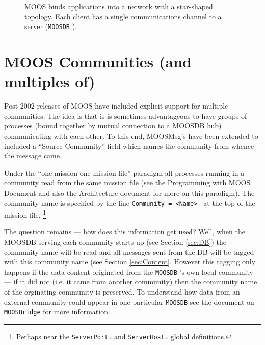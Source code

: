 \documentclass[a4paper,10pt]{article}
\newcommand{\Code}[1]{\texttt{#1} }
\newcommand{\code}[1]{\Code{#1} }
\newcommand{\DB}   {\code{{MOOSDB}}}
\begin{document}
\begin{figure}[ht!]
\centering  {}
\caption{MOOS binds applications into a network with a star-shaped
topology. Each client has a single communications channel to a
server (\DB).} \label{fig:Topology}
\end{figure}

\section{MOOS Communities (and multiples
of)}\label{sec:Communities}

Post 2002 releases of MOOS have included explicit support
for multiple communities. The idea is that is is sometimes
advantageous to have groups of processes (bound together by mutual
connection to a MOOSDB hub) communicating with each other. To this
end, MOOSMsg's have been extended to included a ``Source
Community'' field which names the community from whence the
message came.

Under the ``one mission one mission file'' paradigm all processes
running  in a community read from the same mission file (see the Programming with MOOS Document and also the Architecture document for more on this paradigm). The community name is specified by
the line \code{Community = <Name> } at the top of the mission
file. \footnote{Perhaps near the \code{ServerPort=} and
\code{ServerHost=} global definitions.}

The question remains --- how does this information get used? Well,
when the MOOSDB serving each community starts up (see Section
\ref{sec:DB}) the community name will be read and all messages
sent from the DB will be tagged with this community name (see
Section \ref{sec:Content}. However this tagging only happens if
the data content originated from the \DB's own local community
--- if it did not (i.e. it came from another community) then the
community name of the orginating community is preserved. To
understand how data from an external community could appear in one
particular \DB see the document on \code{MOOSBridge} for more information.
\end{document}

